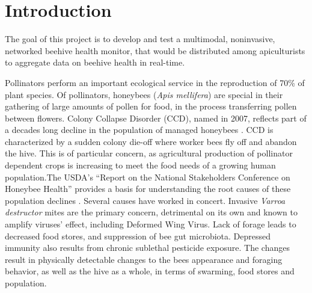 
\section{Introduction}

The goal of this project is to develop and test a multimodal, noninvasive, networked beehive health monitor, that would be distributed among apiculturists to aggregate data on beehive health in real-time.

Pollinators perform an important ecological service in the reproduction of 70\% of plant species. Of pollinators, honeybees (\textit{Apis mellifera}) are special in their gathering of large amounts of pollen for food, in the process transferring pollen between flowers. Colony Collapse Disorder (CCD), named in 2007, reflects part of a decades long decline in the population of managed honeybees \cite{spivak2010plight}. CCD is characterized by a sudden colony die-off where worker bees fly off and abandon the hive. This is of particular concern, as agricultural production of pollinator dependent crops is increasing to meet the food needs of a growing human population.The USDA’s “Report on the National Stakeholders Conference on Honeybee Health” provides a basis for understanding the root causes of these population declines \cite{national2012report}. Several causes have worked in concert. Invasive \textit{Varroa destructor} mites are the primary concern, detrimental on its own and known to amplify viruses' effect, including Deformed Wing Virus. Lack of forage  leads to decreased food stores, and suppression of bee gut microbiota. Depressed immunity also results from chronic sublethal pesticide exposure. The changes result in physically detectable changes to the bees appearance and foraging behavior, as well as the hive as a whole, in terms of swarming, food stores and population. 


